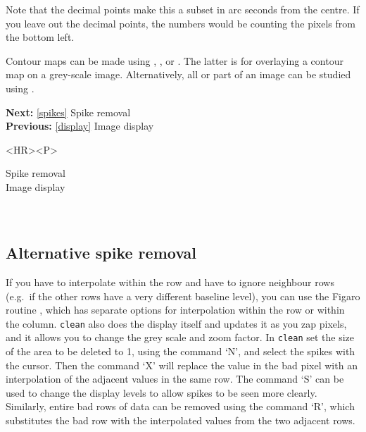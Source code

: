    Note that the decimal points make this a subset in arc seconds from
   the centre. If you leave out the decimal points, the numbers would be
   counting the pixels from the bottom left.

\begin{latexonly}
\begin{center}
\leavevmode\epsfysize=80mm
\end{center}
\end{latexonly}

   Contour maps can be made using
{\tt {}},
{\tt {}},
   or
{\tt {}}.
   The latter is for overlaying a contour map on a grey-scale image.
   Alternatively, all or part of an image can be studied using
{\tt {}}.

\begin{latexonly}
{\bf Next:} \ref{spikes} Spike removal\\
{\bf Previous:} \ref{display} Image display\\
\end{latexonly}

\begin{htmlonly}
\begin{rawhtml} <HR><P> \end{rawhtml}
{\bf {}} Spike removal\\
{\bf {}} Image display\\
{\bf {}}\\
{\bf {}}\\
\end{htmlonly}


\subsection{\label{spikes2}Alternative spike removal}

   If you have to interpolate within the row and have to ignore neighbour
   rows (e.g.\ if the other rows have a very different baseline level),
   you can use the Figaro routine
{\tt {}},
   which has separate options for interpolation within the row or within
   the column. {\tt clean} also does the display itself and updates it
   as you zap pixels, and it allows you to change the grey scale and
   zoom factor. In {\tt clean} set the size of the area to be deleted to
   1, using the command `N', and select the spikes with the cursor.
   Then the command `X' will replace the value in the bad pixel with an
   interpolation of the adjacent values in the same row. The command `S'
   can be used to change the display levels to allow spikes to be seen
   more clearly. Similarly, entire bad rows of data can be removed using
   the command `R', which substitutes the bad row with the interpolated
   values from the two adjacent rows.

